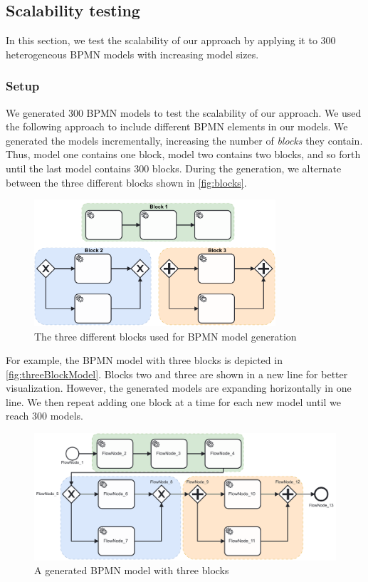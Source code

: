 \documentclass{lmcs} %
\begin{document}
\subsection{Scalability testing} \label{subsec:scalability}

In this section, we test the scalability of our approach by applying it to 300 heterogeneous BPMN models with increasing model sizes. 

\subsubsection{Setup}

We generated 300 BPMN models to test the scalability of our approach.
We used the following approach to include different BPMN elements in our models.
We generated the models incrementally, increasing the number of \textit{blocks} they contain.
Thus, model one contains one block, model two contains two blocks, and so forth until the last model contains 300 blocks.
During the generation, we alternate between the three different blocks shown in \autoref{fig:blocks}.

\begin{figure}[ht]
    \centering
    \includegraphics[width=0.8\textwidth]{images/blocks.pdf}
    \caption{The three different blocks used for BPMN model generation}
    \label{fig:blocks}
\end{figure}

For example, the BPMN model with three blocks is depicted in \autoref{fig:threeBlockModel}.
Blocks two and three are shown in a new line for better visualization.
However, the generated models are expanding horizontally in one line.
We then repeat adding one block at a time for each new model until we reach 300 models.

\begin{figure}[ht]
    \centering
    \includegraphics[width=1\textwidth]{images/003.pdf}
    \caption{A generated BPMN model with three blocks}
    \label{fig:threeBlockModel}
\end{figure}
\end{document}
